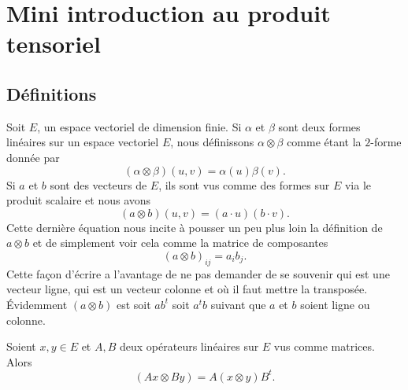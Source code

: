 \section{Mini introduction au produit tensoriel}
\label{SeOOpHsn}

\subsection{Définitions}

Soit \( E\), un espace vectoriel de dimension finie. Si \( \alpha\) et \( \beta\) sont deux formes linéaires sur un espace vectoriel \( E\), nous définissons \( \alpha\otimes \beta\) comme étant la \( 2\)-forme donnée par
\begin{equation}
    (\alpha\otimes \beta)(u,v)=\alpha(u)\beta(v).
\end{equation}
Si \( a\) et \( b\) sont des vecteurs de \( E\), ils sont vus comme des formes sur \( E\) via le produit scalaire et nous avons
\begin{equation}
    (a\otimes b)(u,v)=(a\cdot u)(b\cdot v).
\end{equation}
Cette dernière équation nous incite à pousser un peu plus loin la définition de \( a\otimes b\) et de simplement voir cela comme la matrice de composantes
\begin{equation}
    (a\otimes b)_{ij}=a_ib_j.
\end{equation}
Cette façon d'écrire a l'avantage de ne pas demander de se souvenir qui est une vecteur ligne, qui est un vecteur colonne et où il faut mettre la transposée. Évidemment \( (a\otimes b)\) est soit \( ab^t\) soit \( a^tb\) suivant que \( a\) et \( b\) soient ligne ou colonne.

\begin{lemma}   \label{LemMyKPzY}
    Soient \( x,y\in E\) et \( A,B\) deux opérateurs linéaires sur \( E\) vus comme matrices. Alors
    \begin{equation}        \label{EqXdxvSu}
        (Ax\otimes By)=A(x\otimes y)B^t.
    \end{equation}
\end{lemma}

